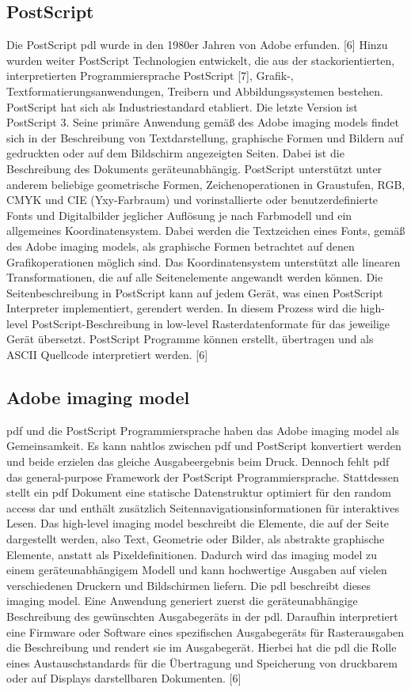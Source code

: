 \subsection{PostScript}
Die PostScript \gls{pdl} wurde in den 1980er Jahren von Adobe erfunden. [6] Hinzu wurden weiter PostScript Technologien entwickelt, die aus der stackorientierten, interpretierten Programmiersprache PostScript [7], Grafik-, Textformatierungsanwendungen, Treibern und Abbildungssystemen bestehen. PostScript hat sich als Industriestandard etabliert. Die letzte Version ist PostScript 3. Seine primäre Anwendung gemäß des Adobe imaging models findet sich in der Beschreibung von Textdarstellung, graphische Formen und Bildern auf gedruckten oder auf dem Bildschirm angezeigten Seiten. Dabei ist die Beschreibung des Dokuments geräteunabhängig. PostScript unterstützt unter anderem beliebige geometrische Formen, Zeichenoperationen in Graustufen, RGB, CMYK und CIE (Yxy-Farbraum) und  vorinstallierte oder benutzerdefinierte Fonts und Digitalbilder jeglicher Auflösung je nach Farbmodell und ein allgemeines Koordinatensystem.
Dabei werden die Textzeichen eines Fonts, gemäß des Adobe imaging models, als graphische Formen betrachtet auf denen Grafikoperationen möglich sind. Das Koordinatensystem unterstützt alle linearen Transformationen, die auf alle Seitenelemente angewandt werden können. Die Seitenbeschreibung in PostScript kann auf jedem Gerät, was einen PostScript Interpreter implementiert, gerendert werden. In diesem Prozess wird die high-level PostScript-Beschreibung in low-level Rasterdatenformate für das jeweilige Gerät übersetzt. PostScript Programme können erstellt, übertragen und als ASCII Quellcode interpretiert werden. [6]
\par
\subsection{Adobe imaging model}
\gls{pdf} und die PostScript Programmiersprache haben das Adobe imaging model als Gemeinsamkeit. Es kann nahtlos zwischen \gls{pdf} und PostScript konvertiert werden und beide erzielen das gleiche Ausgabeergebnis beim Druck. Dennoch fehlt \gls{pdf} das general-purpose Framework der PostScript Programmiersprache. Stattdessen stellt ein \gls{pdf} Dokument eine statische Datenstruktur optimiert für den random access dar und enthält zusätzlich Seitennavigationsinformationen für interaktives Lesen. Das high-level imaging model beschreibt die Elemente, die auf der Seite dargestellt werden, also Text, Geometrie oder Bilder, als abstrakte graphische Elemente, anstatt als Pixeldefinitionen. Dadurch wird das imaging model zu einem geräteunabhängigem Modell und kann hochwertige Ausgaben auf vielen verschiedenen Druckern und Bildschirmen liefern. Die \gls{pdl} beschreibt dieses imaging model. Eine Anwendung generiert zuerst die geräteunabhängige Beschreibung des gewünschten Ausgabegeräts in der \gls{pdl}. Daraufhin interpretiert eine Firmware oder Software eines spezifischen Ausgabegeräts für Rasterausgaben die Beschreibung und rendert sie im Ausgabegerät. Hierbei hat die \gls{pdl} die Rolle eines Austauschstandards für die Übertragung und Speicherung von druckbarem oder auf Displays darstellbaren Dokumenten. [6]
